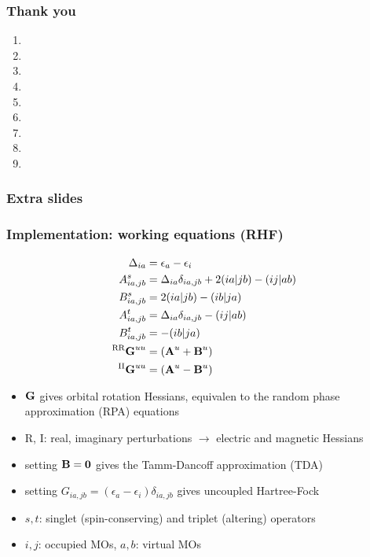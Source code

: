 \documentclass{beamer}
\begin{document}
\begin{frame}
  \frametitle{Thank you}
  \scriptsize
  \begin{enumerate}
  \item {}
  \item {}
  \item {}
  \item {}
  \item {}
  \item {}
  \item {}
  \item {}
  \item {}
  \end{enumerate}
\end{frame}

\begin{frame}
  \frametitle{Extra slides}
\end{frame}

\begin{frame}
  \frametitle{Implementation: working equations (RHF)}
  \begin{align*}
    \Delta_{ia} &= \epsilon_{a} - \epsilon_{i} \\
    A_{ia,jb}^{s} &= \Delta_{ia}\delta_{ia,jb} + 2(ia|jb) - (ij|ab) \\
    B_{ia,jb}^{s} &= 2(ia|jb) - (ib|ja) \\
    A_{ia,jb}^{t} &= \Delta_{ia}\delta_{ia,jb} - (ij|ab) \\
    B_{ia,jb}^{t} &= - (ib|ja) \\
    ^{\text{RR}}\boldsymbol{\mathbf{G}}^{uu} &= (\boldsymbol{\mathbf{A}}^{u} + \boldsymbol{\mathbf{B}}^{u}) \\
    ^{\text{II}}\boldsymbol{\mathbf{G}}^{uu} &= (\boldsymbol{\mathbf{A}}^{u} - \boldsymbol{\mathbf{B}}^{u})
  \end{align*}
  \scriptsize
  \begin{itemize}
  \item \(\boldsymbol{\mathbf{G}}\) gives orbital rotation Hessians, equivalen to the random phase approximation (RPA) equations \\
  \item R, I: real, imaginary perturbations \(\rightarrow\) electric and magnetic Hessians \\
  \item setting \(\boldsymbol{\mathbf{B}} = \boldsymbol{\mathbf{0}}\) gives the Tamm-Dancoff approximation (TDA) \\
  \item setting \( G_{ia,jb} = (\epsilon_{a} - \epsilon_{i})\delta_{ia,jb} \) gives uncoupled Hartree-Fock \\
  \item \(s,t\): singlet (spin-conserving) and triplet (altering) operators \\
  \item \(i,j\): occupied MOs, \(a,b\): virtual MOs
  \end{itemize}
\end{frame}
\end{document}
